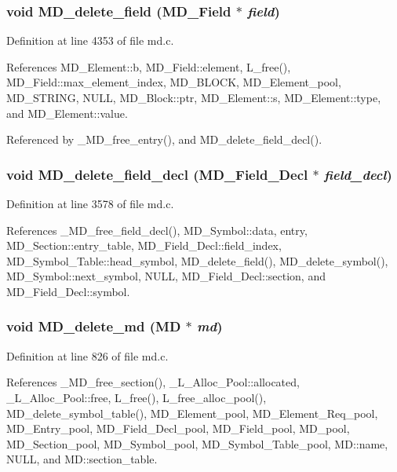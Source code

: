\subsubsection{\setlength{\rightskip}{0pt plus 5cm}void MD\_\-delete\_\-field (\bf{MD\_\-Field} $\ast$ {\em field})}\label{md_8h_a6e7b63f7fd6d15327aff3b6e0c6ff61}




Definition at line 4353 of file md.c.

References MD\_\-Element::b, MD\_\-Field::element, L\_\-free(), MD\_\-Field::max\_\-element\_\-index, MD\_\-BLOCK, MD\_\-Element\_\-pool, MD\_\-STRING, NULL, MD\_\-Block::ptr, MD\_\-Element::s, MD\_\-Element::type, and MD\_\-Element::value.

Referenced by \_\-MD\_\-free\_\-entry(), and MD\_\-delete\_\-field\_\-decl().
\subsubsection{\setlength{\rightskip}{0pt plus 5cm}void MD\_\-delete\_\-field\_\-decl (\bf{MD\_\-Field\_\-Decl} $\ast$ {\em field\_\-decl})}\label{md_8h_76528f257b1781ee2ed2d2d7ebdae9b0}




Definition at line 3578 of file md.c.

References \_\-MD\_\-free\_\-field\_\-decl(), MD\_\-Symbol::data, entry, MD\_\-Section::entry\_\-table, MD\_\-Field\_\-Decl::field\_\-index, MD\_\-Symbol\_\-Table::head\_\-symbol, MD\_\-delete\_\-field(), MD\_\-delete\_\-symbol(), MD\_\-Symbol::next\_\-symbol, NULL, MD\_\-Field\_\-Decl::section, and MD\_\-Field\_\-Decl::symbol.
\subsubsection{\setlength{\rightskip}{0pt plus 5cm}void MD\_\-delete\_\-md (\bf{MD} $\ast$ {\em md})}\label{md_8h_99c47f09ca8903d26efed1efe24e352e}




Definition at line 826 of file md.c.

References \_\-MD\_\-free\_\-section(), \_\-L\_\-Alloc\_\-Pool::allocated, \_\-L\_\-Alloc\_\-Pool::free, L\_\-free(), L\_\-free\_\-alloc\_\-pool(), MD\_\-delete\_\-symbol\_\-table(), MD\_\-Element\_\-pool, MD\_\-Element\_\-Req\_\-pool, MD\_\-Entry\_\-pool, MD\_\-Field\_\-Decl\_\-pool, MD\_\-Field\_\-pool, MD\_\-pool, MD\_\-Section\_\-pool, MD\_\-Symbol\_\-pool, MD\_\-Symbol\_\-Table\_\-pool, MD::name, NULL, and MD::section\_\-table.
